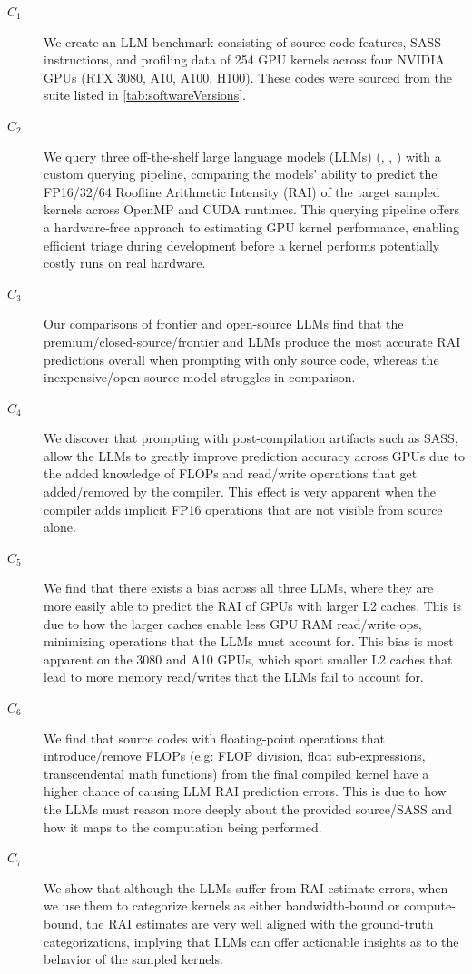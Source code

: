 \begin{description}
\item[$C_1$] We create an LLM benchmark consisting of source code features, SASS instructions, and profiling data of 254 GPU kernels across four NVIDIA GPUs (RTX 3080, A10, A100, H100).
These codes were sourced from the \hecbench suite listed in \autoref{tab:softwareVersions}.
\item[$C_2$] We query three off-the-shelf large language models (LLMs) (\gptoss, \gptfivefour, \opus) with a custom querying pipeline, comparing the models' ability to predict the FP16/32/64 Roofline Arithmetic Intensity (RAI) of the target sampled kernels across OpenMP and CUDA runtimes.
This querying pipeline offers a hardware-free approach to estimating GPU kernel performance, enabling efficient triage during development before a kernel performs potentially costly runs on real hardware.
\item[$C_3$] Our comparisons of frontier and open-source LLMs find that the premium/closed-source/frontier \opus and \gptfivefour LLMs produce the most accurate RAI predictions overall when prompting with only source code, whereas the inexpensive/open-source \gptoss model struggles in comparison. 
\item[$C_4$] We discover that prompting with post-compilation artifacts such as SASS, allow the LLMs to greatly improve prediction accuracy across GPUs due to the added knowledge of FLOPs and read/write operations that get added/removed by the compiler.
This effect is very apparent when the compiler adds implicit FP16 operations that are not visible from source alone.
\item[$C_5$] We find that there exists a bias across all three LLMs, where they are more easily able to predict the RAI of GPUs with larger L2 caches. 
This is due to how the larger caches enable less GPU RAM read/write ops, minimizing operations that the LLMs must account for.
This bias is most apparent on the 3080 and A10 GPUs, which sport smaller L2 caches that lead to more memory read/writes that the LLMs fail to account for.
\item[$C_6$] We find that source codes with floating-point operations that introduce/remove FLOPs (e.g: FLOP division, float sub-expressions, transcendental math functions) from the final compiled kernel have a higher chance of causing LLM RAI prediction errors.
This is due to how the LLMs must reason more deeply about the provided source/SASS and how it maps to the computation being performed.
\item[$C_7$] We show that although the LLMs suffer from RAI estimate errors, when we use them to categorize kernels as either bandwidth-bound or compute-bound, the RAI estimates are very well aligned with the ground-truth categorizations, implying that LLMs can offer actionable insights as to the behavior of the sampled kernels.

\end{description}
